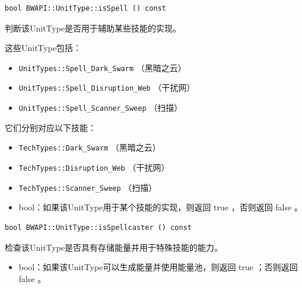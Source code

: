 \begin{tcolorbox}[colback=white, colframe=black!60!white, title=isSpell(), arc=0mm]
    \begin{verbatim}
bool BWAPI::UnitType::isSpell () const
    \end{verbatim}
    判断该UnitType是否用于辅助某些技能的实现。\par 这些UnitType包括：
    \begin{itemize}
        \item \verb|UnitTypes::Spell_Dark_Swarm|  （黑暗之云）
        \item \verb|UnitTypes::Spell_Disruption_Web|  （干扰网）
        \item \verb|UnitTypes::Spell_Scanner_Sweep|  （扫描）
    \end{itemize}
    它们分别对应以下技能：
    \begin{itemize}
        \item \verb|TechTypes::Dark_Swarm|  （黑暗之云）
        \item \verb|TechTypes::Disruption_Web|  （干扰网）
        \item \verb|TechTypes::Scanner_Sweep|  （扫描）
    \end{itemize}
\begin{return}
\begin{itemize}
    \item bool：如果该UnitType用于某个技能的实现，则返回   true  ，否则返回   false  。
\end{itemize}
\end{return}
\end{tcolorbox}


\begin{tcolorbox}[colback=white, colframe=black!60!white, title=isSpellcaster(), arc=0mm]
    \begin{verbatim}
bool BWAPI::UnitType::isSpellcaster () const
    \end{verbatim}
    检查该UnitType是否具有存储能量并用于特殊技能的能力。
\begin{return}
\begin{itemize}
    \item bool：如果该UnitType可以生成能量并使用能量池，则返回   true  ；否则返回   false  。
\end{itemize}
\end{return}
\end{tcolorbox}



